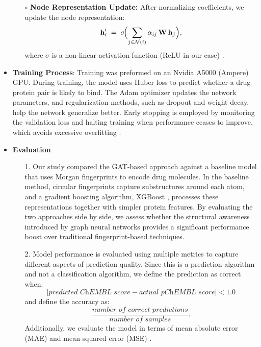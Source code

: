 \documentclass[fontsize=11pt]{article}
\begin{document}
\begin{itemize}
\begin{itemize}
            \item[$\circ$] \textbf{Node Representation Update:} After normalizing coefficients, we update the node representation: 
            \[
                \mathbf{h}_i' \;=\;
                \sigma\!\Bigl(\sum_{j \in \mathcal{N}(i)}
                      \alpha_{ij}\,\mathbf{W}\,\mathbf{h}_j\Bigr),
            \]
            where $\sigma$ is a non-linear activation function (ReLU in our case) \cite{Velickovic2018}.
        \end{itemize}

    \item \textbf{Training Process}: Training was preformed on an Nvidia A5000 (Ampere) GPU. During training, the model uses Huber loss to predict whether a drug-protein pair is likely to bind. The Adam optimizer updates the network parameters, and regularization methods, such as dropout and weight decay, help the network generalize better. Early stopping is employed by monitoring the validation loss and halting training when performance ceases to improve, which avoids excessive overfitting \cite{Chen2016}.\\

    \item \textbf{Evaluation}
    \begin{itemize}
        \item[1.] Our study compared the GAT-based approach against a baseline model that uses Morgan fingerprints \cite{Rogers2010} to encode drug molecules. In the baseline method, circular fingerprints capture substructures around each atom, and a gradient boosting algorithm, XGBoost \cite{ChenGuestrin2016}, processes these representations together with simpler protein features. By evaluating the two approaches side by side, we assess whether the structural awareness introduced by graph neural networks provides a significant performance boost over traditional fingerprint-based techniques.
        \item[2.] Model performance is evaluated using multiple metrics to capture different aspects of prediction quality. Since this is a prediction algorithm and not a classification algorithm, we define the prediction as correct when:
        \[
        |\textit{predicted ChEMBL score} - \textit{actual pChEMBL score}| < 1.0
        \]
        and define the accuracy as:
        \[
        \frac{\textit{number of correct predictions}}{\textit{number of samples}}.
        \]
        Additionally, we evaluate the model in terms of mean absolute error (MAE) and mean squared error (MSE) \cite{Chen2016}.
        

\end{itemize}
\end{itemize}
\end{document}
